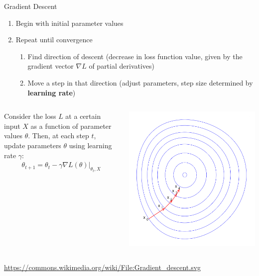 \documentclass[ignorenonframetext,xcolor=x11names]{beamer}
\begin{document}
\begin{frame}{Gradient Descent}
\begin{enumerate}
   \item Begin with initial parameter values
   \item Repeat until convergence
   \begin{enumerate}
      \item Find direction of descent (decrease in loss function value, given by the gradient vector $\nabla L$ of partial derivatives)
      \item Move a step in that direction (adjust parameters, step size determined by \textbf{learning rate})
   \end{enumerate}
\end{enumerate}
\begin{columns}
\begin{column}{0.6\textwidth}
\vspace{\baselineskip} 

Consider the loss $L$ at a certain input $X$ as a function of parameter values $\theta$. Then, at each step $t$, update parameters $\theta$ using learning rate $\gamma$:
\begin{align*}
\theta_{t+1} = \theta_t - \gamma \nabla L(\theta) \rvert_{\theta_t, X}
\end{align*}
\end{column}
\begin{column}{0.4\textwidth}
\centering
\includegraphics[width=\textwidth]{gradient_descent.png}
\end{column}
\end{columns}

\scriptsize \url{https://commons.wikimedia.org/wiki/File:Gradient_descent.svg}
\end{frame}
\end{document}
